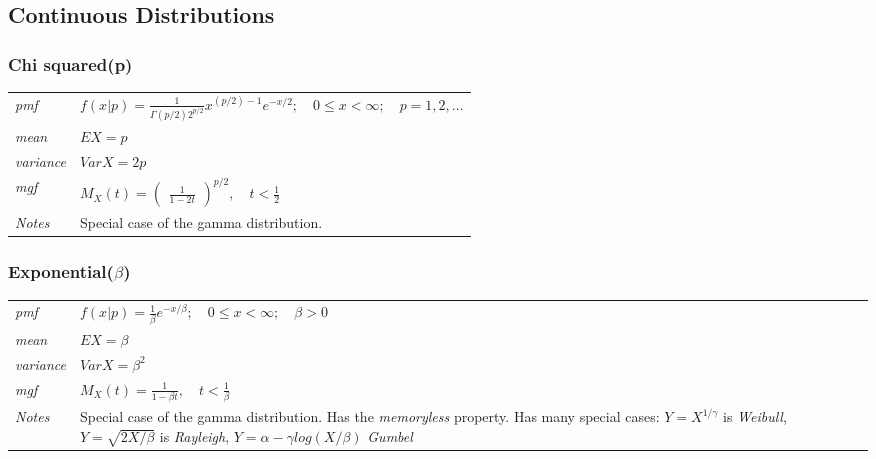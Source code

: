 \documentclass[12pt]{article}
\begin{document}
\subsection*{Continuous Distributions}
\subsubsection*{Chi squared(p)\cite[p. 623]{StatisticalInference}}
\begin{tabularx}{\textwidth}{ l X }
\emph{pmf} & $f(x|p)=\frac{1}{\Gamma(p/2)2^{p/2}}x^{(p/2)-1}e^{-x/2}; \quad 0 \leq x < \infty; \quad p=1, 2, \dots$ \\
\emph{mean} & $EX = p$ \\
\emph{variance} & $Var X = 2p$ \\
\emph{mgf} & $M_X(t)=\begin{pmatrix} \frac{1}{1-2t} \end{pmatrix}^{p/2}, \quad t < \frac{1}{2}$ \\
\emph{Notes} & Special case of the gamma distribution.\\
\end{tabularx}

\subsubsection*{Exponential($\beta$)\cite[p. 624]{StatisticalInference}}
\begin{tabularx}{\textwidth}{ l X }
\emph{pmf} & $f(x|p)=\frac{1}{\beta}e^{-x/\beta}; \quad 0 \leq x < \infty; \quad \beta>0$ \\
\emph{mean} & $EX = \beta$ \\
\emph{variance} & $Var X = \beta^2$ \\
\emph{mgf} & $M_X(t)= \frac{1}{1-\beta t}, \quad t < \frac{1}{\beta}$ \\
\emph{Notes} & Special case of the gamma distribution. Has the \emph{memoryless} property. Has many special cases: $Y=X^{1/\gamma}$ is \emph{Weibull}, $Y=\sqrt{2X/\beta}$ is \emph{Rayleigh}, $Y=\alpha - \gamma log(X/\beta)$ \emph{Gumbel}\\
\end{tabularx}
\end{document}
